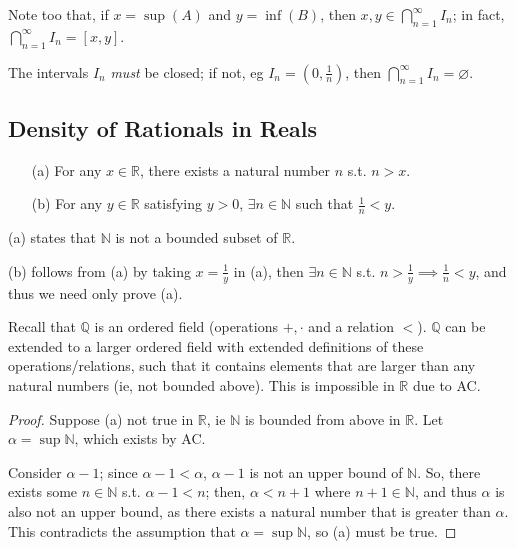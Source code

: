 \documentclass[12pt]{article}
\begin{document}
\begin{remark}
  Note too that, if $x = \sup(A)$ and $y = \inf(B)$, then $x, y \in \bigcap_{n=1}^\infty I_n$; in fact, $\bigcap_{n=1}^\infty I_n = [x,y]$.
\end{remark}

\begin{remark}
  The intervals $I_n$ \emph{must} be closed; if not, eg $I_n = (0, \frac{1}{n})$, then $\bigcap_{n=1}^\infty I_n = \varnothing$.
\end{remark}

\subsection{Density of Rationals in Reals}

\begin{proposition}\label{prop:archimedian}
  \begin{itemize}
    \item[(a)] For any $x \in \mathbb{R}$, there exists a natural number $n$ s.t. $n > x$.
    \item[(b)] For any $y \in \mathbb{R}$ satisfying $y > 0$, $\exists n \in \mathbb{N}$ such that $\frac{1}{n} < y$.
  \end{itemize}
\end{proposition}
\begin{remark}
  (a) states that $\mathbb{N}$ is not a bounded subset of $\mathbb{R}$.

\end{remark}
  
\begin{remark}
  (b) follows from (a) by taking $x = \frac{1}{y}$ in (a), then $\exists n\in \mathbb{N}$ s.t. $n > \frac{1}{y} \implies \frac{1}{n} < y$, and thus we need only prove (a).
\end{remark}

\begin{remark}
  Recall that $\mathbb{Q}$ is an ordered field (operations $+, \cdot$ and a relation $<$). $\mathbb{Q}$ can be extended to a larger ordered field with extended definitions of these operations/relations, such that it contains elements that are larger than any natural numbers (ie, not bounded above). This is impossible in $\mathbb{R}$ due to AC.
\end{remark}

\begin{proof}[Proof]
   Suppose (a) not true in $\mathbb{R}$, ie $\mathbb{N}$ is bounded from above in $\mathbb{R}$. Let $\alpha = \sup \mathbb{N}$, which exists by AC.

   Consider $\alpha - 1$; since $\alpha - 1 < \alpha$, $\alpha - 1$ is not an upper bound of $\mathbb{N}$. So, there exists some $n \in \mathbb{N}$ s.t. $\alpha - 1 < n$; then, $\alpha < n+ 1$ where $n+1 \in \mathbb{N}$, and thus $\alpha$ is also not an upper bound, as there exists a natural number that is greater than $\alpha$. This contradicts the assumption that $\alpha = \sup \mathbb{N}$, so (a) must be true.
\end{proof}
\end{document}

